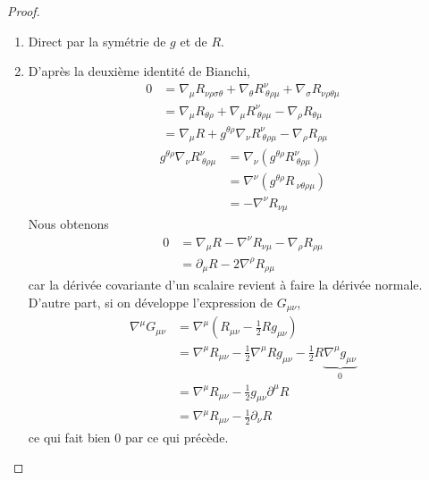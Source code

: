 \documentclass[a4paper,11pt]{report}
\theoremstyle{definition}
\theoremstyle{plain}
\theoremstyle{definition}
\theoremstyle{remark}
\newcommand{\p}{\partial}
\begin{document}
        \begin{proof}${}$
            \begin{enumerate}[label = \textit{\roman*)}]
                \item Direct par la symétrie de $g$ et de $R$.
                \item D'après la deuxième identité de Bianchi, 
                \begin{align}
                    0& =\nabla_\mu R_{\nu\rho\sigma\theta} + \nabla_\theta R^\nu_{~\theta\rho\mu}+\nabla_\sigma R_{\nu\rho\theta\mu} \\
                    &= \nabla_\mu R_{\theta\rho}+\nabla_\mu R^\nu_{~\theta\rho\mu} - \nabla_\rho R_{\theta\mu} \\
                    &= \nabla_\mu R + g^{\theta\rho} \nabla_\nu R^\nu_{~\theta\rho\mu} - \nabla_\rho R_{\rho\mu} 
                \end{align}
                \begin{align}
                    g^{\theta\rho} \nabla_\nu R^\nu_{~\theta\rho\mu} &= \nabla_\nu (g^{\theta\rho}R^\nu_{~\theta\rho\mu}) \\
                    &= \nabla^\nu (g^{\theta\rho}R_{~\nu\theta\rho\mu})\\
                    &= -\nabla^\nu R_{\nu\mu}
                \end{align}
                Nous obtenons 
                \begin{align}
                    0 &= \nabla_\mu R -\nabla^\nu R_{\nu\mu} - \nabla_\rho R_{\rho\mu}\\
                    &= \p_\mu R -2\nabla^\rho R_{\rho\mu}
                \end{align}
                car la dérivée covariante d'un scalaire revient à faire la dérivée normale. D'autre part, si on développe l'expression de $G_{\mu\nu}$,
                \begin{align}
                    \nabla^\mu G_{\mu\nu} &= \nabla^\mu \left(R_{\mu\nu}-\frac{1}{2}Rg_{\mu\nu}\right)\\
                    &= \nabla^\mu R_{\mu\nu}-\frac{1}{2}\nabla^\mu Rg_{\mu\nu}-\frac{1}{2}R \underbrace{\nabla^\mu g_{\mu\nu}}_{0}\\
                    &= \nabla^\mu R_{\mu\nu} -\frac{1}{2}g_{\mu\nu}\p^\mu R \\
                    &= \nabla^\mu R_{\mu\nu} -\frac{1}{2}\p_\nu R 
                \end{align}
                ce qui fait bien $0$ par ce qui précède.
            \end{enumerate}
        \end{proof}
        
\end{document}
